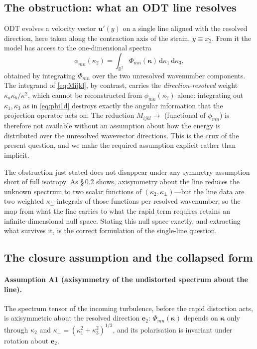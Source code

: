 \documentclass[lineno]{JFM-FLM_Au}
\begin{document}
\subsection{The obstruction: what an ODT line resolves}\label{sec:obstruction}

ODT evolves a velocity vector $\boldsymbol{u}'(y)$ on a single line aligned
with the resolved direction, here taken along the contraction axis of the
strain, $y\equiv x_2$. From it the model has access to the one-dimensional
spectra
\begin{equation}
  \phi_{mn}(\kappa_2)
  = \int_{\mathbb{R}^2}
      \Phi_{mn}(\boldsymbol{\kappa})\,
      \mathrm{d}\kappa_1\,\mathrm{d}\kappa_3,
  \label{eq:phi1d}
\end{equation}
obtained by integrating $\Phi_{mn}$ over the two
unresolved wavenumber components. The integrand of \eqref{eq:Mijkl}, by
contrast, carries the \emph{direction-resolved} weight
$\kappa_a\kappa_b/\kappa^2$, which cannot be reconstructed from
$\phi_{mn}(\kappa_2)$ alone: integrating out $\kappa_1,\kappa_3$ as in
\eqref{eq:phi1d} destroys exactly the angular information that the projection
operator acts on. The reduction $M_{ijkl}\!\to\!$ (functional of
$\phi_{mn}$) is therefore not available without an assumption about how the
energy is distributed over the unresolved wavevector directions. This is the
crux of the present question, and we make the required assumption explicit
rather than implicit.

The obstruction just stated does not disappear under any symmetry
assumption short of full isotropy. As \S\,\ref{sec:assumption} shows,
axisymmetry about the line reduces the unknown spectrum to two scalar
functions of $(\kappa_2,\kappa_\perp)$---but the line data are two weighted
$\kappa_\perp$-integrals of those functions per resolved wavenumber, so the
map from what the line carries to what the rapid term requires retains an
infinite-dimensional null space. Stating this null space exactly, and
extracting what survives it, is the correct formulation of the single-line
question.

\subsection{The closure assumption and the collapsed form}
\label{sec:assumption}

\paragraph{Assumption A1 (axisymmetry of the undistorted spectrum about the
line).} The spectrum tensor of the incoming turbulence, before the rapid
distortion acts, is axisymmetric about the resolved direction $\boldsymbol{e}_2$:
$\Phi_{mn}(\boldsymbol{\kappa})$ depends on $\boldsymbol{\kappa}$ only through
$\kappa_2$ and $\kappa_\perp=(\kappa_1^2+\kappa_3^2)^{1/2}$, and its
polarisation is invariant under rotation about $\boldsymbol{e}_2$.
\end{document}
